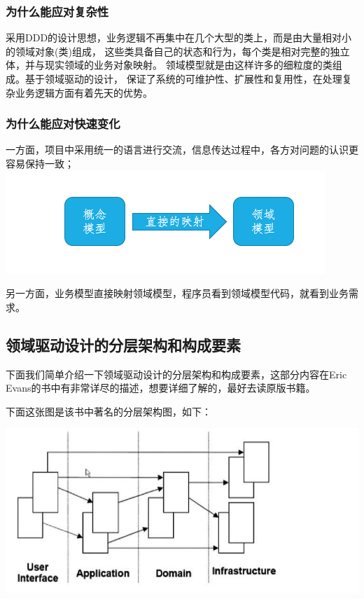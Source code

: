 \documentclass[journal]{IEEEtran}
\begin{document}
\begin{CJK*}{UTF8}{gbsn}
\subsubsection{为什么能应对复杂性}
采用DDD的设计思想，业务逻辑不再集中在几个大型的类上，而是由大量相对小的领域对象(类)组成，
这些类具备自己的状态和行为，每个类是相对完整的独立体，并与现实领域的业务对象映射。
领域模型就是由这样许多的细粒度的类组成。基于领域驱动的设计，
保证了系统的可维护性、扩展性和复用性，在处理复杂业务逻辑方面有着先天的优势。
\\
\subsubsection{为什么能应对快速变化}
一方面，项目中采用统一的语言进行交流，信息传达过程中，各方对问题的认识更容易保持一致；
\includegraphics[scale=0.4]{1.png}

另一方面，业务模型直接映射领域模型，程序员看到领域模型代码，就看到业务需求。

\subsection{领域驱动设计的分层架构和构成要素}

下面我们简单介绍一下领域驱动设计的分层架构和构成要素，这部分内容在Eric Evans的书中有非常详尽的描述，想要详细了解的，最好去读原版书籍。

下面这张图是该书中著名的分层架构图，如下：

\includegraphics[scale=0.4]{3.jpeg}
\\


\end{CJK*}
\end{document}
